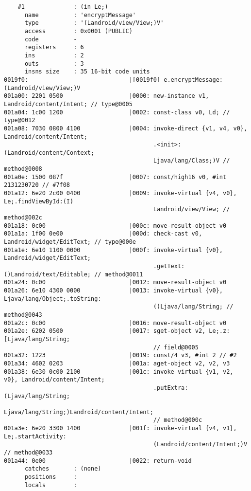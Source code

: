 \begin{lstlisting}
    #1              : (in Le;)
      name          : 'encryptMessage'
      type          : '(Landroid/view/View;)V'
      access        : 0x0001 (PUBLIC)
      code          -
      registers     : 6
      ins           : 2
      outs          : 3
      insns size    : 35 16-bit code units
0019f0:                             |[0019f0] e.encryptMessage:(Landroid/view/View;)V
001a00: 2201 0500                   |0000: new-instance v1, Landroid/content/Intent; // type@0005
001a04: 1c00 1200                   |0002: const-class v0, Ld; // type@0012
001a08: 7030 0800 4100              |0004: invoke-direct {v1, v4, v0}, Landroid/content/Intent;
                                           .<init>:(Landroid/content/Context;
                                           Ljava/lang/Class;)V // method@0008
001a0e: 1500 087f                   |0007: const/high16 v0, #int 2131230720 // #7f08
001a12: 6e20 2c00 0400              |0009: invoke-virtual {v4, v0}, Le;.findViewById:(I)
                                           Landroid/view/View; // method@002c
001a18: 0c00                        |000c: move-result-object v0
001a1a: 1f00 0e00                   |000d: check-cast v0, Landroid/widget/EditText; // type@000e
001a1e: 6e10 1100 0000              |000f: invoke-virtual {v0}, Landroid/widget/EditText;
                                           .getText:()Landroid/text/Editable; // method@0011
001a24: 0c00                        |0012: move-result-object v0
001a26: 6e10 4300 0000              |0013: invoke-virtual {v0}, Ljava/lang/Object;.toString:
                                           ()Ljava/lang/String; // method@0043
001a2c: 0c00                        |0016: move-result-object v0
001a2e: 6202 0500                   |0017: sget-object v2, Le;.z:[Ljava/lang/String;
                                           // field@0005
001a32: 1223                        |0019: const/4 v3, #int 2 // #2
001a34: 4602 0203                   |001a: aget-object v2, v2, v3
001a38: 6e30 0c00 2100              |001c: invoke-virtual {v1, v2, v0}, Landroid/content/Intent;
                                           .putExtra:(Ljava/lang/String;
                                           Ljava/lang/String;)Landroid/content/Intent;
                                           // method@000c
001a3e: 6e20 3300 1400              |001f: invoke-virtual {v4, v1}, Le;.startActivity:
                                           (Landroid/content/Intent;)V // method@0033
001a44: 0e00                        |0022: return-void
      catches       : (none)
      positions     :
      locals        :


\end{lstlisting}
